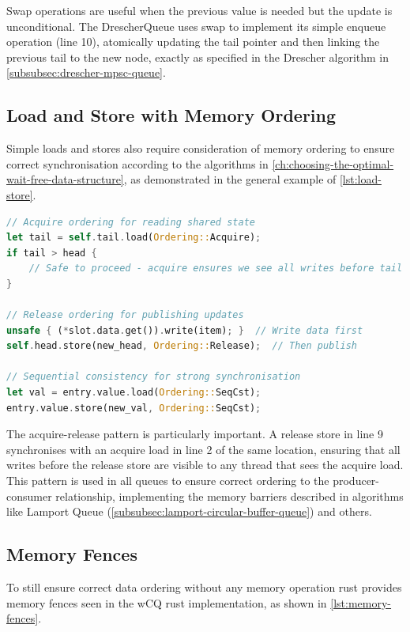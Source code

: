 Swap operations are useful when the previous value is needed but the update is unconditional. The DrescherQueue uses swap to implement its simple enqueue operation (line 10), atomically updating the tail pointer and then linking the previous tail to the new node, exactly as specified in the Drescher algorithm in \cref{subsubsec:drescher-mpsc-queue}.

\subsection{Load and Store with Memory Ordering}

Simple loads and stores also require consideration of memory ordering to ensure correct synchronisation according to the algorithms in \cref{ch:choosing-the-optimal-wait-free-data-structure}, as demonstrated in the general example of \cref{lst:load-store}.

\begin{lstlisting}[language=Rust, style=boxed, caption={Memory ordering for loads and stores}, label={lst:load-store}]
// Acquire ordering for reading shared state
let tail = self.tail.load(Ordering::Acquire);
if tail > head {
    // Safe to proceed - acquire ensures we see all writes before tail update
}

// Release ordering for publishing updates
unsafe { (*slot.data.get()).write(item); }  // Write data first
self.head.store(new_head, Ordering::Release);  // Then publish

// Sequential consistency for strong synchronisation
let val = entry.value.load(Ordering::SeqCst);
entry.value.store(new_val, Ordering::SeqCst);
\end{lstlisting}

The acquire-release pattern is particularly important. A release store in line 9 synchronises with an acquire load in line 2 of the same location, ensuring that all writes before the release store are visible to any thread that sees the acquire load. This pattern is used in all queues to ensure correct ordering to the producer-consumer relationship, implementing the memory barriers described in algorithms like Lamport Queue (\cref{subsubsec:lamport-circular-buffer-queue}) and others.

\subsection{Memory Fences}

To still ensure correct data ordering without any memory operation rust provides memory fences seen in the \ac{wCQ} rust implementation, as shown in \cref{lst:memory-fences}.

